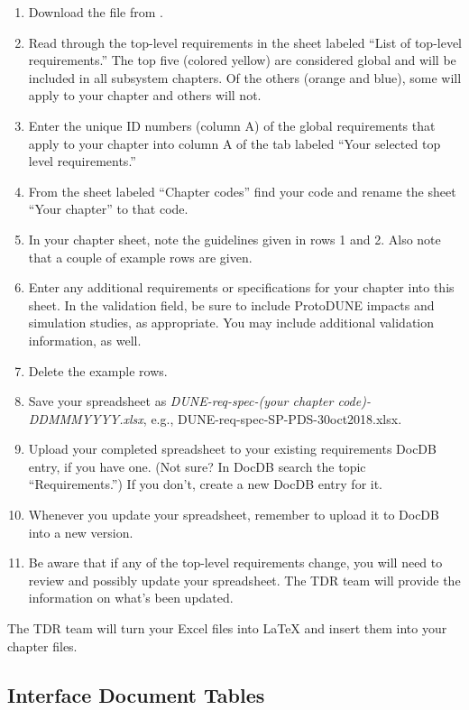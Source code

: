 \begin{enumerate}
\item Download the file from .
\item Read through the top-level requirements in the sheet labeled ``List of top-level requirements.''  The top five (colored yellow) are considered global and will be included in all subsystem chapters. Of the others (orange and blue), some will apply to your chapter and others will not.
\item Enter the unique ID numbers (column A) of the global requirements that apply to your chapter into column A of the tab labeled ``Your selected top level requirements.''
\item From the sheet labeled ``Chapter codes'' find your code and rename the sheet ``Your chapter'' to that code.
\item In your chapter sheet, note the guidelines given in rows 1 and 2. Also note that a couple of example rows are given.
\item  Enter any additional requirements or specifications for your chapter into this sheet.  In the validation field, be sure to include ProtoDUNE impacts and simulation studies, as appropriate. You may include additional validation information, as well.
\item Delete the example rows.
\item Save your spreadsheet as \textit{DUNE-req-spec-(your chapter code)-DDMMMYYYY.xlsx}, e.g., DUNE-req-spec-SP-PDS-30oct2018.xlsx.
\item Upload your completed spreadsheet to your existing requirements DocDB entry, if you have one. (Not sure? In DocDB search the topic ``Requirements.'') If you don't, create a new DocDB entry for it. 
\item Whenever you update your spreadsheet, remember to upload it to DocDB into a new version. 
\item Be aware that if any of the top-level requirements change, you will need to review and possibly update your spreadsheet.  The TDR team will provide the information on what's been updated.
\end{enumerate}

The TDR team will turn your Excel files into LaTeX and insert them into your chapter files.

\subsection{Interface Document Tables}
\label{sec:tables-intfc}

